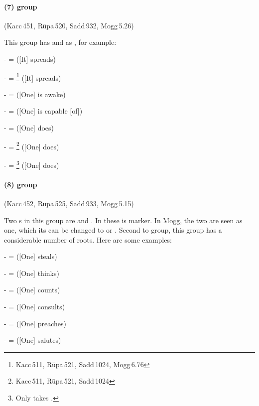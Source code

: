\paragraph*{(7)  group} (Kacc\,451, R\=upa\,520, Sadd\,932, Mogg\,5.26)\label{pacca:o2}\label{pacca:yira}\par
This group has  and  as , for example:\par
-  =  ([It] spreads)\par
-  = \footnote{Kacc\,511, R\=upa\,521, Sadd\,1024, Mogg\,6.76} ([It] spreads)\par
-  =  ([One] is awake)\par
-  =  ([One] is capable [of])\par
-  =  ([One] does)\par
-  = \footnote{Kacc\,511, R\=upa\,521, Sadd\,1024} ([One] does)\par
-  = \footnote{Only  takes .} ([One] does)\par

\paragraph*{(8)  group} (Kacc\,452, R\=upa\,525, Sadd\,933, Mogg\,5.15)\label{pacca:dne1}\label{pacca:dnaya1}\label{pacca:dni1}\par
Two s in this group are  and . In these  is  marker. In Mogg, the two are seen as one,  which its  can be changed to  or . Second to  group, this group has a considerable number of roots. Here are some examples:\par
-  =  ([One] steals)\par
-  =  ([One] thinks)\par
-  =  ([One] counts)\par
-  =  ([One] consults)\par
-  =  ([One] preaches)\par
-  =  ([One] salutes)\par

